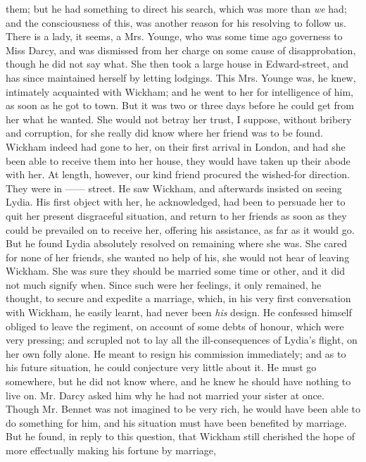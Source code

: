 \begin{letter}
them; but he had something to direct his search, which
was more than \textit{we} had; and the consciousness of this,
was another reason for his resolving to follow us. There
is a lady, it seems, a Mrs. Younge, who was some
time ago governess to Miss Darcy, and was dismissed
from her charge on some cause of disapprobation, though
he did not say what. She then took a large house in
Edward-street, and has since maintained herself by letting
lodgings. This Mrs. Younge was, he knew, intimately
acquainted with Wickham; and he went to her for intelligence
of him, as soon as he got to town. But it was
two or three days before he could get from her what he
wanted. She would not betray her trust, I suppose,
without bribery and corruption, for she really did know
where her friend was to be found. Wickham indeed had
gone to her, on their first arrival in London, and had she
been able to receive them into her house, they would
have taken up their abode with her. At length, however,
our kind friend procured the wished-for direction. They
were in ------ street. He saw Wickham, and afterwards
insisted on seeing Lydia. His first object with her, he
acknowledged, had been to persuade her to quit her
present disgraceful situation, and return to her friends as
soon as they could be prevailed on to receive her, offering
his assistance, as far as it would go. But he found Lydia
absolutely resolved on remaining where she was. She
cared for none of her friends, she wanted no help of his,
she would not hear of leaving Wickham. She was sure
they should be married some time or other, and it did
not much signify when. Since such were her feelings,
it only remained, he thought, to secure and expedite
a marriage, which, in his very first conversation with
Wickham, he easily learnt, had never been \textit{his} design.
He confessed himself obliged to leave the regiment, on
account of some debts of honour, which were very pressing;
and scrupled not to lay all the ill-consequences of Lydia’s
flight, on her own folly alone. He meant to resign his
commission immediately; and as to his future situation,
he could conjecture very little about it. He must go
somewhere, but he did not know where, and he knew he
should have nothing to live on. Mr. Darcy asked him
why he had not married your sister at once. Though
Mr. Bennet was not imagined to be very rich, he would
have been able to do something for him, and his situation
must have been benefited by marriage. But he found,
in reply to this question, that Wickham still cherished
the hope of more effectually making his fortune by marriage,

\end{letter}
